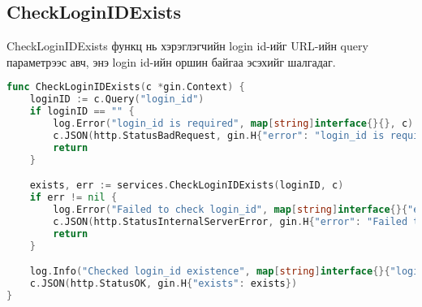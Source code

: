\subsection{CheckLoginIDExists}
CheckLoginIDExists функц нь хэрэглэгчийн login id-ийг URL-ийн query параметрээс авч, энэ login id-ийн оршин байгаа эсэхийг шалгадаг.
\begin{lstlisting}[language=Go, caption=CheckLoginIDExists Controller, frame=single]
func CheckLoginIDExists(c *gin.Context) {
	loginID := c.Query("login_id")
	if loginID == "" {
		log.Error("login_id is required", map[string]interface{}{}, c)
		c.JSON(http.StatusBadRequest, gin.H{"error": "login_id is required"})
		return
	}

	exists, err := services.CheckLoginIDExists(loginID, c)
	if err != nil {
		log.Error("Failed to check login_id", map[string]interface{}{"error": err.Error()}, c)
		c.JSON(http.StatusInternalServerError, gin.H{"error": "Failed to check login_id"})
		return
	}

	log.Info("Checked login_id existence", map[string]interface{}{"login_id": loginID, "exists": exists}, c)
	c.JSON(http.StatusOK, gin.H{"exists": exists})
}

\end{lstlisting}
